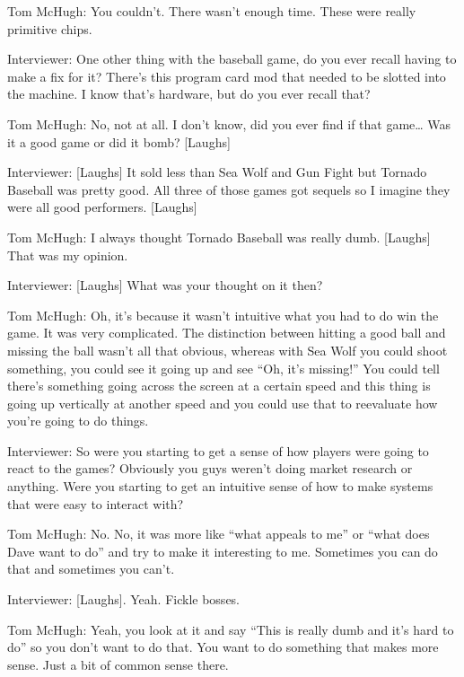 \textcolor{interviewee}{Tom McHugh:} You couldn’t. There wasn’t enough time. These were really primitive chips.

\textcolor{interviewer}{Interviewer:} One other thing with the baseball game, do you ever recall having to make a fix for it? There’s this program card mod that needed to be slotted into the machine. I know that’s hardware, but do you ever recall that?

\textcolor{interviewee}{Tom McHugh:} No, not at all. I don’t know, did you ever find if that game… Was it a good game or did it bomb? [Laughs]

\textcolor{interviewer}{Interviewer:} [Laughs] It sold less than Sea Wolf and Gun Fight but Tornado Baseball was pretty good. All three of those games got sequels so I imagine they were all good performers. [Laughs]

\textcolor{interviewee}{Tom McHugh:} I always thought Tornado Baseball was really dumb. [Laughs] That was my opinion.

\textcolor{interviewer}{Interviewer:} [Laughs] What was your thought on it then?

\textcolor{interviewee}{Tom McHugh:} Oh, it’s because it wasn’t intuitive what you had to do win the game. It was very complicated. The distinction between hitting a good ball and missing the ball wasn’t all that obvious, whereas with Sea Wolf you could shoot something, you could see it going up and see “Oh, it’s missing!” You could tell there’s something going across the screen at a certain speed and this thing is going up vertically at another speed and you could use that to reevaluate how you’re going to do things.

\textcolor{interviewer}{Interviewer:} So were you starting to get a sense of how players were going to react to the games? Obviously you guys weren’t doing market research or anything. Were you starting to get an intuitive sense of how to make systems that were easy to interact with?

\textcolor{interviewee}{Tom McHugh:} No. No, it was more like “what appeals to me” or “what does Dave want to do” and try to make it interesting to me. Sometimes you can do that and sometimes you can’t.

\textcolor{interviewer}{Interviewer:} [Laughs]. Yeah. Fickle bosses.

\textcolor{interviewee}{Tom McHugh:} Yeah, you look at it and say “This is really dumb and it’s hard to do” so you don’t want to do that. You want to do something that makes more sense. Just a bit of common sense there.

